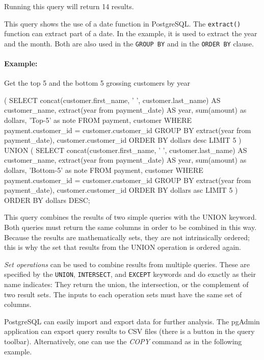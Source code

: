 \begin{withcode}
Running this query will return 14 results.

This query shows the use of a date function in PostgreSQL. The \texttt{extract()} function can extract part of a date. In the example, it is used to extract the year and the month. Both are also used in the \texttt{GROUP BY} and in the \texttt{ORDER BY} clause. 

\paragraph*{Example:} Get the top 5 and the bottom 5 grossing customers by year


\begin{sqlcode}
( SELECT concat(customer.first_name, ' ', 
                customer.last_name) AS customer_name,
       extract(year from payment_date) AS year, 
       sum(amount) as dollars,
       'Top-5' as note
FROM payment, customer
WHERE payment.customer_id = customer.customer_id
GROUP BY extract(year from payment_date),
         customer.customer_id
ORDER BY dollars desc
LIMIT 5
) UNION (
SELECT concat(customer.first_name, ' ', 
              customer.last_name) AS customer_name,
       extract(year from payment_date) AS year, 
       sum(amount) as dollars,
       'Bottom-5' as note
FROM payment, customer
WHERE payment.customer_id = customer.customer_id
GROUP BY extract(year from payment_date),
         customer.customer_id
ORDER BY dollars asc
LIMIT 5 ) ORDER BY dollars DESC;
\end{sqlcode}

This query combines the results of two simple queries with the UNION keyword. Both queries must return the same columns in order to be combined in this way. Because the results are mathematically sets, they are not intrinsically ordered; this is why the set that results from the UNION operation is ordered again.

\emph{Set operations} can be used to combine results from multiple queries. These are specified by the \texttt{UNION}, \texttt{INTERSECT}, and \texttt{EXCEPT} keywords and do exactly as their name indicates: They return the union, the intersection, or the complement of two result sets. The inputs to each operation sets must have the same set of columns.

PostgreSQL can easily import and export data for further analysis. The pgAdmin application can export query results to CSV files (there is a button in the query toolbar). Alternatively, one can use the \emph{COPY} command as in the following example.


\end{withcode}
